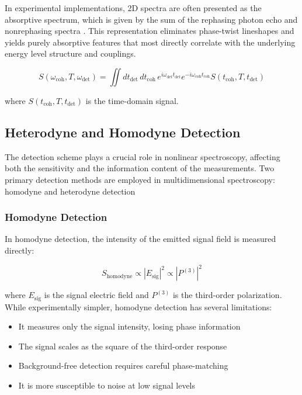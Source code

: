 \noindent In experimental implementations, 2D spectra are often presented as the absorptive spectrum, which is given by the sum of the rephasing photon echo and nonrephasing spectra \cite{cho2009twodimensionalopticalspectroscopy}. This representation eliminates phase-twist lineshapes and yields purely absorptive features that most directly correlate with the underlying energy level structure and couplings.

\begin{equation}
	S(\omega_{\text{coh}}, T, \omega_{\text{det}}) = \iint dt_{\text{det}}\, dt_{\text{coh}}\, e^{i\omega_{\text{det}} t_{\text{det}}} e^{-i\omega_{\text{coh}} t_{\text{coh}}} S(t_{\text{coh}}, T, t_{\text{det}})
	\label{eq:2des_signal}
\end{equation}

\noindent where $S(t_{\text{coh}}, T, t_{\text{det}})$ is the time-domain signal.

\subsection{Heterodyne and Homodyne Detection}
\label{subsec:heterodyne_homodyne}

\noindent The detection scheme plays a crucial role in nonlinear spectroscopy, affecting both the sensitivity and the information content of the measurements. Two primary detection methods are employed in multidimensional spectroscopy: homodyne and heterodyne detection %

\subsubsection{Homodyne Detection}
\label{subsubsec:homodyne}

\noindent In homodyne detection, the intensity of the emitted signal field is measured directly:

\begin{equation}
	S_{\text{homodyne}} \propto |E_{\text{sig}}|^2 \propto |P^{(3)}|^2
	\label{eq:homodyne}
\end{equation}

\noindent where $E_{\text{sig}}$ is the signal electric field and $P^{(3)}$ is the third-order polarization. While experimentally simpler, homodyne detection has several limitations:

\begin{itemize}
	\item It measures only the signal intensity, losing phase information
	\item The signal scales as the square of the third-order response
	\item Background-free detection requires careful phase-matching
	\item It is more susceptible to noise at low signal levels
\end{itemize}

